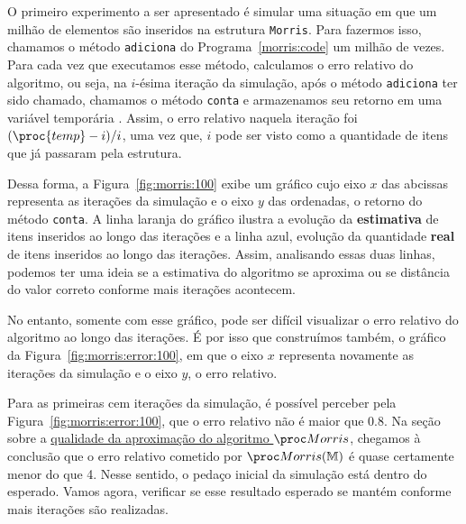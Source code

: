 O primeiro experimento a ser apresentado é simular uma situação em que um milhão de elementos são inseridos na estrutura 
\texttt{Morris}. Para fazermos isso, chamamos o método \texttt{adiciona} do Programa~\ref{morris:code} um milhão de 
vezes. Para cada vez que executamos esse método, calculamos o erro relativo do algoritmo, ou seja, na $i$-ésima 
iteração da simulação, após o método \texttt{adiciona} ter sido chamado, chamamos o método \texttt{conta} e armazenamos 
seu retorno em uma variável temporária . Assim, o erro relativo naquela iteração foi $(\proc{temp} - i) / i$, 
uma vez que, $i$ pode ser visto como a quantidade de itens que já passaram pela estrutura.

Dessa forma, a Figura~\ref{fig:morris:100} exibe um gráfico cujo eixo $x$ das abcissas representa as iterações da 
simulação e o eixo $y$ das ordenadas, o retorno do método \texttt{conta}. A linha laranja do gráfico ilustra a evolução 
da \textbf{estimativa} de itens inseridos ao longo das iterações e a linha azul, evolução da quantidade \textbf{real} de 
itens inseridos ao longo das iterações. Assim, analisando essas duas linhas, podemos ter uma ideia se a estimativa do 
algoritmo se aproxima ou se distância do valor correto conforme mais iterações acontecem.

No entanto, somente com esse gráfico, pode ser difícil visualizar o erro relativo do algoritmo ao longo das iterações. 
É por isso que construímos também, o gráfico da Figura~\ref{fig:morris:error:100}, em que o eixo $x$ representa 
novamente as iterações da simulação e o eixo $y$, o erro relativo.

Para as primeiras cem iterações da simulação, é possível perceber pela Figura~\ref{fig:morris:error:100}, que o erro 
relativo não é maior que $0.8$. Na seção sobre a 
\hyperref[sec:morris:analysis]{qualidade da aproximação do algoritmo $\Morris$}, chegamos à conclusão que o erro 
relativo cometido por $\Morris(\Mbb)$ é quase certamente menor do que 4. Nesse sentido, o pedaço inicial da simulação 
está dentro do esperado. Vamos agora, verificar se esse resultado esperado se mantém conforme mais iterações são 
realizadas.


